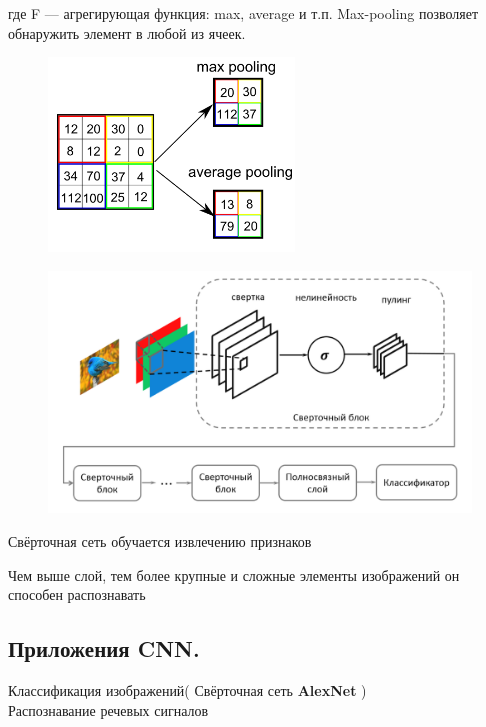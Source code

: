 \begin{description}
где  F  — агрегирующая функция: max, average и т.п. Max-pooling позволяет обнаружить элемент в любой из ячеек.

\begin{figure}[h]

\centering

\includegraphics[width=0.2\linewidth]{chapters/neural/images/пуллинг.png}

\label{fig:pulling}

\end{figure}

\begin{figure}[h]

\centering

\includegraphics[width=0.8\linewidth]{chapters/neural/images/1CNN.png}

\label{fig:one_cnn}

\end{figure}

Свёрточная сеть обучается извлечению признаков

Чем выше слой, тем более крупные и сложные элементы изображений он способен распознавать

\newpage
\subsection{Приложения CNN.}

Классификация изображений( Свёрточная сеть \textbf{AlexNet} )\\

Распознавание речевых сигналов\\
\begin{figure}[h]


\end{figure}
\end{description}
